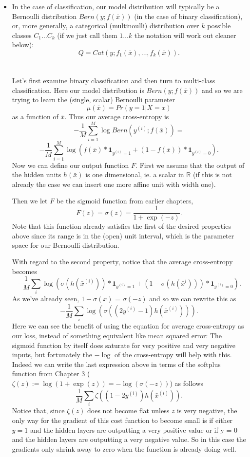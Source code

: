 \documentclass{article}
\begin{document}
\begin{itemize}
\item In the case of classification, our model distribution will typically be a Bernoulli distribution $Bern(y; f(\bar{x}))$ (in the case of binary classification), or, more generally, a categorical (multinoulli) distribution over $k$ possible classes $C_{1} \ldots C_{k}$ (if we just call them $1\ldots k$ the notation will work out cleaner below):
$$Q = Cat(y ; f_{1}(\bar{x}), \ldots, f_{k}(\bar{x})).$$ \\

\paragraph{} Let's first examine binary classification and then turn to multi-class classification.  Here our model distribution is $Bern(y; f(\bar{x}))$ and so we are trying to learn the (single, scalar) Bernoulli parameter 
$$\mu(\bar{x}) = Pr( y = 1 \vert X = x)$$ as a function of $\bar{x}$.  Thus our average cross-entropy is 
$$-\frac{1}{M}\sum_{i=1}^{M} \log{Bern(y^{(i)}; f(\bar{x}))} = $$
$$-\frac{1}{M}\sum_{i=1}^{M} \log{(f(\bar{x})*\mathbf{1}_{y^{(i)} = 1} + (1 - f(\bar{x}))*\mathbf{1}_{y^{(i)} = 0})}.$$
Now we can define our output function $F$.  First we assume that the output of the hidden units $h(\bar{x})$ is one dimensional, ie. a scalar in $\mathbb{R}$ (if this is not already the case we can insert one more affine unit with width one).

Then we let $F$ be the sigmoid function from earlier chapters, 
$$F(z) = \sigma(z) = \frac{1}{1+\exp(-z)}.$$ Note that this function already satisfies the first of the desired properties above since its range is in the (open) unit interval, which is the parameter space for our Bernoulli distribution. 

With regard to the second property, notice  that the average cross-entropy becomes 
$$-\frac{1}{M}\sum_{i} \log{\left(\sigma(h(\bar{x}^{(i)}))*\mathbf{1}_{y^{(i)} = 1} + (1 - \sigma(h(\bar{x}^{i})))*\mathbf{1}_{y^{(i)} = 0}\right)}.$$
As we've already seen, $1 - \sigma(x)$ = $\sigma(-z)$ and so we can rewrite this as 
$$-\frac{1}{M}\sum_{i} \log{\left(\sigma\left((2y^{(i)} -1) h(\bar{x}^{(i)})\right)\right)}.$$
Here we can see the benefit of using the equation for average cross-entropy as our loss, instead of something equivalent like mean squared error:  The sigmoid function by itself does saturate for very positive and very negative inputs, but fortunately the $-\log$ of the cross-entropy will help with this.  Indeed we can write the last expression above in terms of the softplus function from Chapter 3
 ($\zeta(z) := \log{(1 + \exp{(z)})} = -\log{(\sigma(-z))}$)
 as follows
 $$\frac{1}{M}\sum_{i} \zeta((1 - 2y^{(i)}) h(\bar{x}^{(i)}) ).$$
Notice that, since $\zeta(z)$ does not become flat unless $z$ is very negative, the only way for the gradient of this cost function to become small is if either $y = 1$ and the hidden layers are outputting a very positive value or if y = 0 and the hidden layers are outputting a very negative value.  So in this case the gradients only shrink away to zero when the function is already doing well.


\end{itemize}
\end{document}
